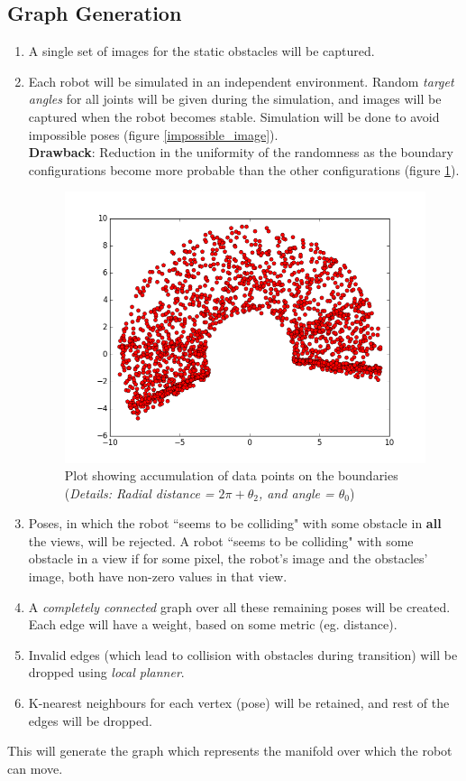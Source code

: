 \documentclass[12pt, two column]{article}
\begin{document}
\subsection{Graph Generation}
  \begin{enumerate}
    \item A single set of images for the static obstacles will be captured.
    \item Each robot will be simulated in an independent environment. Random \textit{target angles} for all joints will be given during the simulation, and images will be captured when the robot becomes stable. Simulation will be done to avoid impossible poses (figure \ref{impossible_image}). \\ \textbf{Drawback}: Reduction in the uniformity of the randomness as the boundary configurations become more probable than the other configurations (figure \ref{matPlotLib_image}).
    \begin{figure}
    \includegraphics[width=\linewidth]{graphics/theta_2_theta_0}
    \caption{Plot showing accumulation of data points on the boundaries (\textit{Details: Radial distance = $2\pi + \theta_2$, and angle = $\theta_0$})}
    \label{matPlotLib_image}
    \end{figure}
    \item Poses, in which the robot ``seems to be colliding" with some obstacle in \textbf{all} the views, will be rejected. A robot ``seems to be colliding" with some obstacle in a view if for some pixel, the robot's image and the obstacles' image, both have non-zero values in that view.
    \item A \textit{completely connected} graph over all these remaining poses will be created. Each edge will have a weight, based on some metric (eg. distance).
    \item Invalid edges (which lead to collision with obstacles during transition) will be dropped using \textit{local planner}.
    \item K-nearest neighbours for each vertex (pose) will be retained, and rest of the edges will be dropped.
  \end{enumerate}
  This will generate the graph which represents the manifold over which the robot can move.
\end{document}
